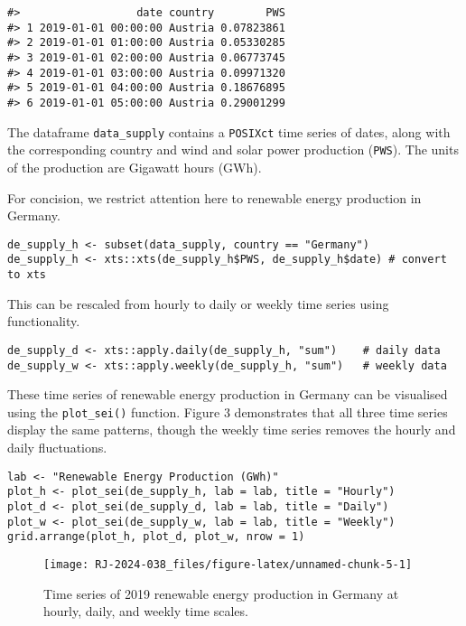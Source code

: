 \begin{verbatim}
#>                  date country        PWS
#> 1 2019-01-01 00:00:00 Austria 0.07823861
#> 2 2019-01-01 01:00:00 Austria 0.05330285
#> 3 2019-01-01 02:00:00 Austria 0.06773745
#> 4 2019-01-01 03:00:00 Austria 0.09971320
#> 5 2019-01-01 04:00:00 Austria 0.18676895
#> 6 2019-01-01 05:00:00 Austria 0.29001299
\end{verbatim}

The dataframe \texttt{data\_supply} contains a \texttt{POSIXct} time series of dates, along with the corresponding country and wind and solar power production (\texttt{PWS}). The units of the production are Gigawatt hours (GWh).

For concision, we restrict attention here to renewable energy production in Germany.

\begin{verbatim}
de_supply_h <- subset(data_supply, country == "Germany")
de_supply_h <- xts::xts(de_supply_h$PWS, de_supply_h$date) # convert to xts
\end{verbatim}

This can be rescaled from hourly to daily or weekly time series using  functionality.

\begin{verbatim}
de_supply_d <- xts::apply.daily(de_supply_h, "sum")    # daily data
de_supply_w <- xts::apply.weekly(de_supply_h, "sum")   # weekly data
\end{verbatim}

These time series of renewable energy production in Germany can be visualised using the \texttt{plot\_sei()} function. Figure 3 demonstrates that all three time series display the same patterns, though the weekly time series removes the hourly and daily fluctuations.

\begin{verbatim}
lab <- "Renewable Energy Production (GWh)"
plot_h <- plot_sei(de_supply_h, lab = lab, title = "Hourly")
plot_d <- plot_sei(de_supply_d, lab = lab, title = "Daily")
plot_w <- plot_sei(de_supply_w, lab = lab, title = "Weekly")
grid.arrange(plot_h, plot_d, plot_w, nrow = 1)
\end{verbatim}

\begin{figure}

{\centering \texttt{[image: RJ-2024-038\_files/figure-latex/unnamed-chunk-5-1]} 

}

\caption{Time series of 2019 renewable energy production in Germany at hourly, daily, and weekly time scales.}\label{fig:unnamed-chunk-5}
\end{figure}

